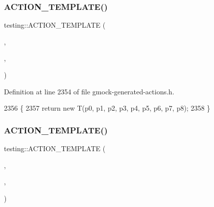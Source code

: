 \subsubsection{\texorpdfstring{A\+C\+T\+I\+O\+N\+\_\+\+T\+E\+M\+P\+L\+A\+T\+E()}{ACTION\_TEMPLATE()}\hspace{0.1cm}{\footnotesize\ttfamily [27/28]}}
{\footnotesize\ttfamily testing\+::\+A\+C\+T\+I\+O\+N\+\_\+\+T\+E\+M\+P\+L\+A\+TE (\begin{DoxyParamCaption}\item[{Return\+New}]{,  }\item[{H\+A\+S\+\_\+1\+\_\+\+T\+E\+M\+P\+L\+A\+T\+E\+\_\+\+P\+A\+R\+A\+MS(typename, T)}]{,  }\item[{A\+N\+D\+\_\+9\+\_\+\+V\+A\+L\+U\+E\+\_\+\+P\+A\+R\+A\+MS(p0, p1, p2, p3, p4, p5, p6, p7, p8)}]{ }\end{DoxyParamCaption})}



Definition at line 2354 of file gmock-\/generated-\/actions.\+h.


\begin{DoxyCode}
2356                                                                         \{
2357   \textcolor{keywordflow}{return} \textcolor{keyword}{new} T(p0, p1, p2, p3, p4, p5, p6, p7, p8);
2358 \}
\end{DoxyCode}
\mbox{\label{namespacetesting_a3934a47f6125504c939a3573b7fc55c4}} 
\subsubsection{\texorpdfstring{A\+C\+T\+I\+O\+N\+\_\+\+T\+E\+M\+P\+L\+A\+T\+E()}{ACTION\_TEMPLATE()}\hspace{0.1cm}{\footnotesize\ttfamily [28/28]}}
{\footnotesize\ttfamily testing\+::\+A\+C\+T\+I\+O\+N\+\_\+\+T\+E\+M\+P\+L\+A\+TE (\begin{DoxyParamCaption}\item[{Return\+New}]{,  }\item[{H\+A\+S\+\_\+1\+\_\+\+T\+E\+M\+P\+L\+A\+T\+E\+\_\+\+P\+A\+R\+A\+MS(typename, T)}]{,  }\item[{A\+N\+D\+\_\+10\+\_\+\+V\+A\+L\+U\+E\+\_\+\+P\+A\+R\+A\+MS(p0, p1, p2, p3, p4, p5, p6, p7, p8, p9)}]{ }\end{DoxyParamCaption})}



